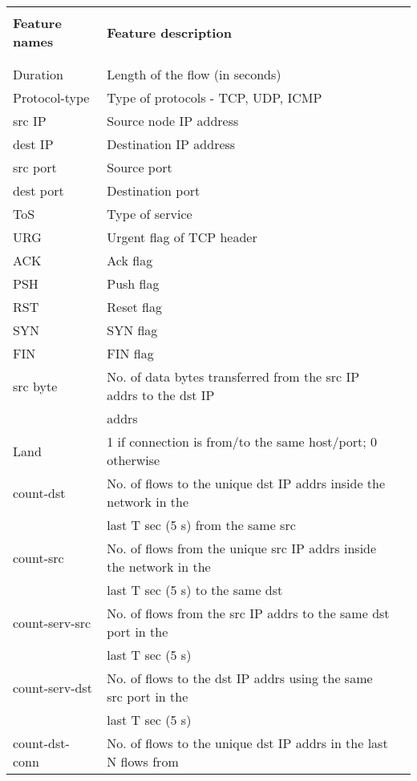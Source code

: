 \centering
{\footnotesize
	 \label{tab:ddos} 
	\begin{tabular}{llr}
		\hline
		&  \\
		\textbf{Feature names}    & \textbf{Feature description} \\
		&  \\
		\hline
		&  \\
		Duration &  Length of the flow (in seconds) \\
		Protocol-type &  Type of protocols - TCP, UDP, ICMP \\
		src IP &  Source node IP address \\
		dest IP &  Destination IP address \\
		src port &  Source port \\
		dest port &  Destination port \\
		ToS &  Type of service \\
		URG &  Urgent flag of TCP header \\
		ACK &  Ack flag \\
		PSH &  Push flag \\
		RST &  Reset flag \\
		SYN &  SYN flag \\
		FIN &  FIN flag \\
		src byte &  No. of data bytes transferred from the src IP addrs to the dst IP  \\
		&addrs \\
		Land &  1 if connection is from/to the same host/port; 0 otherwise \\
		count-dst &  No. of flows to the unique dst IP addrs inside the network in the  \\
		&last T sec (5 s) from the same src \\
		count-src &  No. of flows from the unique src IP addrs inside the network in the  \\
		&last T sec (5 s) to the same dst \\
		count-serv-src &  No. of flows from the src IP addrs to the same dst port in the  \\
		&last T sec (5 s) \\
		count-serv-dst &  No. of flows to the dst IP addrs using the same src port in the  \\
		&last T sec (5 s) \\
		count-dst-conn &  No. of flows to the unique dst IP addrs in the last N flows from \\

\end{tabular}}
